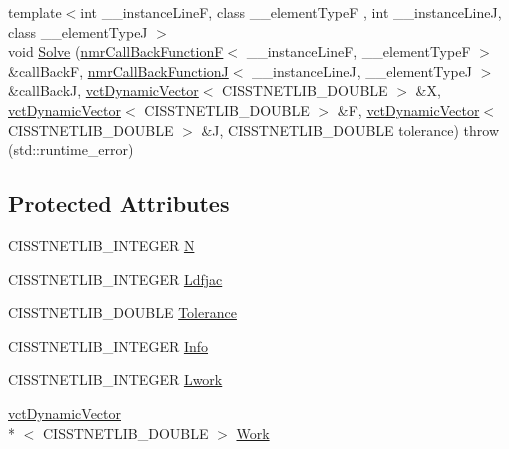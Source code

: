 {\bf }\par
\begin{DoxyCompactItemize}
\item 
{\footnotesize template$<$int \-\_\-\-\_\-instance\-Line\-F, class \-\_\-\-\_\-element\-Type\-F , int \-\_\-\-\_\-instance\-Line\-J, class \-\_\-\-\_\-element\-Type\-J $>$ }\\void \hyperlink{classnmr_fn_jacobian_solver_a085f5cb7f91c8a9e0ef8a69380e3edf4}{Solve} (\hyperlink{classnmr_call_back_function_f}{nmr\-Call\-Back\-Function\-F}$<$ \-\_\-\-\_\-instance\-Line\-F, \-\_\-\-\_\-element\-Type\-F $>$ \&call\-Back\-F, \hyperlink{classnmr_call_back_function_j}{nmr\-Call\-Back\-Function\-J}$<$ \-\_\-\-\_\-instance\-Line\-J, \-\_\-\-\_\-element\-Type\-J $>$ \&call\-Back\-J, \hyperlink{classvct_dynamic_vector}{vct\-Dynamic\-Vector}$<$ C\-I\-S\-S\-T\-N\-E\-T\-L\-I\-B\-\_\-\-D\-O\-U\-B\-L\-E $>$ \&X, \hyperlink{classvct_dynamic_vector}{vct\-Dynamic\-Vector}$<$ C\-I\-S\-S\-T\-N\-E\-T\-L\-I\-B\-\_\-\-D\-O\-U\-B\-L\-E $>$ \&F, \hyperlink{classvct_dynamic_vector}{vct\-Dynamic\-Vector}$<$ C\-I\-S\-S\-T\-N\-E\-T\-L\-I\-B\-\_\-\-D\-O\-U\-B\-L\-E $>$ \&J, C\-I\-S\-S\-T\-N\-E\-T\-L\-I\-B\-\_\-\-D\-O\-U\-B\-L\-E tolerance)  throw (std\-::runtime\-\_\-error)
\end{DoxyCompactItemize}

\subsection*{Protected Attributes}
\begin{DoxyCompactItemize}
\item 
C\-I\-S\-S\-T\-N\-E\-T\-L\-I\-B\-\_\-\-I\-N\-T\-E\-G\-E\-R \hyperlink{classnmr_fn_jacobian_solver_a64a7c452930ff10113eebecb0557a6e5}{N}
\item 
C\-I\-S\-S\-T\-N\-E\-T\-L\-I\-B\-\_\-\-I\-N\-T\-E\-G\-E\-R \hyperlink{classnmr_fn_jacobian_solver_a02cae10a0151e5937759820a96d87dc8}{Ldfjac}
\item 
C\-I\-S\-S\-T\-N\-E\-T\-L\-I\-B\-\_\-\-D\-O\-U\-B\-L\-E \hyperlink{classnmr_fn_jacobian_solver_a674186e39a43be30ebf759fc267feb64}{Tolerance}
\item 
C\-I\-S\-S\-T\-N\-E\-T\-L\-I\-B\-\_\-\-I\-N\-T\-E\-G\-E\-R \hyperlink{classnmr_fn_jacobian_solver_afa9942d18f7d84f9fcb21f1d0e410fd3}{Info}
\item 
C\-I\-S\-S\-T\-N\-E\-T\-L\-I\-B\-\_\-\-I\-N\-T\-E\-G\-E\-R \hyperlink{classnmr_fn_jacobian_solver_a35ca595e6f6bc84e3aed0ac91643356c}{Lwork}
\item 
\hyperlink{classvct_dynamic_vector}{vct\-Dynamic\-Vector}\\*
$<$ C\-I\-S\-S\-T\-N\-E\-T\-L\-I\-B\-\_\-\-D\-O\-U\-B\-L\-E $>$ \hyperlink{classnmr_fn_jacobian_solver_aa3feee6872edf26213e56a7309aaa2bf}{Work}
\end{DoxyCompactItemize}


